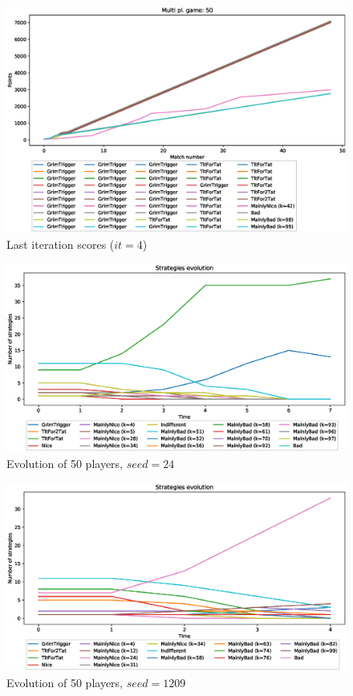 \documentclass[journal,10pt,twoside]{IEEEtran}
\begin{document}
\begin{figure}[!ht]
    \centering
    \includegraphics[width=1\columnwidth]{../img/ripdmp-const/ripdmp-scores-const-pop-50-r3}
    \caption{Last iteration scores ($it=4$)}
    \label{fig:constLI}
\end{figure}

\begin{figure}[!ht]
    \centering
    \includegraphics[width=1\columnwidth]{../img/ripdmp-const/seed24/ripdmp-evolution-const-pop-50}
    \caption{Evolution of 50 players, $seed = 24$}
    \label{fig:constRseed24}
\end{figure}

\begin{figure}[!ht]
    \centering
    \includegraphics[width=1\columnwidth]{../img/ripdmp-const/seed1209/ripdmp-evolution-const-pop-50}
    \caption{Evolution of 50 players, $seed = 1209$}
    \label{fig:constRseed1209}
\end{figure}
\end{document}
